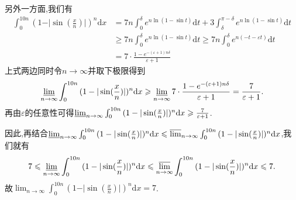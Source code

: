 \documentclass[../../main.tex]{subfiles}%
\begin{document}
\begin{solution}
另外一方面,我们有
\begin{align*}
\int_0^{10n}{(1-\vert\sin(\frac{x}{n})\vert)^n}\mathrm{d}x&=7n\int_0^{\delta}{e^{n\ln(1-\sin t)}}\mathrm{d}t + 3\int_{\delta}^{\pi -\delta}{e^{n\ln(1-\sin t)}}\mathrm{d}t\\
&\geqslant 7n\int_0^{\delta}{e^{n\ln(1-\sin t)}}\mathrm{d}t\geqslant 7n\int_0^{\delta}{e^{n(-t-\varepsilon t)}}\mathrm{d}t\\
&=7\cdot\frac{1 - e^{-(\varepsilon +1)n\delta}}{\varepsilon +1}
\end{align*}
上式两边同时令\(n\rightarrow\infty\)并取下极限得到
\[
\varliminf_{n\rightarrow\infty}\int_0^{10n}{(1-\vert\sin(\frac{x}{n})\vert)^n}\mathrm{d}x\geqslant\varliminf_{n\rightarrow\infty}7\cdot\frac{1 - e^{-(\varepsilon +1)n\delta}}{\varepsilon +1}=\frac{7}{\varepsilon +1}.
\]
再由\(\varepsilon\)的任意性可得\(\varliminf_{n\rightarrow\infty}\int_0^{10n}{(1-\vert\sin(\frac{x}{n})\vert)^n}\mathrm{d}x\geqslant\frac{7}{\varepsilon +1}\).

因此,再结合\(\varliminf_{n\rightarrow\infty}\int_0^{10n}{(1-\vert\sin(\frac{x}{n})\vert)^n}\mathrm{d}x\leqslant\varlimsup_{n\rightarrow\infty}\int_0^{10n}{(1-\vert\sin(\frac{x}{n})\vert)^n}\mathrm{d}x\),我们就有
\[
7\leqslant\varliminf_{n\rightarrow\infty}\int_0^{10n}{(1-\vert\sin(\frac{x}{n})\vert)^n}\mathrm{d}x\leqslant\varlimsup_{n\rightarrow\infty}\int_0^{10n}{(1-\vert\sin(\frac{x}{n})\vert)^n}\mathrm{d}x\leqslant 7.
\]
故\(\lim_{n\rightarrow\infty}\int_0^{10n}{(1-\vert\sin(\frac{x}{n})\vert)^n}\mathrm{d}x = 7\).

\end{solution}
\end{document}
